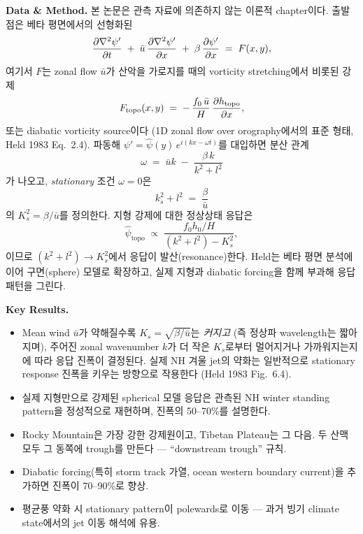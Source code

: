 \medskip
\noindent\textbf{Data \& Method.}\quad
본 논문은 관측 자료에 의존하지 않는 이론적 chapter이다.  출발점은 베타 평면에서의
선형화된 
\begin{equation}\label{eq:ch06_dd_held_qg}
  \frac{\partial \nabla^2\psi'}{\partial t} \;+\; \bar u\,\frac{\partial \nabla^2\psi'}{\partial x}
  \;+\; \beta\,\frac{\partial \psi'}{\partial x} \;=\; F(x,y),
\end{equation}
여기서 $F$는 zonal flow $\bar u$가 산악을 가로지를 때의 vorticity stretching에서 비롯된 강제
\begin{equation}\label{eq:ch06_dd_held_topoforcing}
  F_{\text{topo}}(x,y) \;=\; -\,\frac{f_0\,\bar u}{H}\,\frac{\partial h_{\text{topo}}}{\partial x} ,
\end{equation}
또는 diabatic vorticity source이다 (1D zonal flow over orography에서의 표준 형태,
Held 1983 Eq.~2.4).
파동해 $\psi' = \hat\psi(y)\,e^{i(kx-\omega t)}$를 대입하면 분산 관계
\begin{equation}\label{eq:ch06_dd_held_dispersion}
  \omega \;=\; \bar u k \;-\; \frac{\beta\,k}{k^2 + l^2}
\end{equation}
가 나오고, \emph{stationary} 조건 $\omega = 0$은
\begin{equation}\label{eq:ch06_dd_held_resonant_k}
  \boxed{\;k_s^2 + l^2 \;=\; \frac{\beta}{\bar u}\;}
\end{equation}
의  $K_s^2 = \beta/\bar u$를 정의한다.
지형 강제에 대한 정상상태 응답은
\begin{equation}\label{eq:ch06_dd_held_topo_response}
  \hat\psi_{\text{topo}}
  \;\propto\; \frac{f_0 h_0 / H}{(k^2 + l^2) - K_s^2},
\end{equation}
이므로 $(k^2+l^2) \to K_s^2$에서 응답이 발산(resonance)한다.  Held는 베타 평면 분석에 이어
구면(sphere) 모델로 확장하고, 실제 지형과 diabatic forcing을 함께 부과해 응답 패턴을 그린다.

\medskip
\noindent\textbf{Key Results.}
\begin{itemize}
  \item Mean wind $\bar u$가 약해질수록 $K_s = \sqrt{\beta/\bar u}$는 \emph{커지고}
        (즉 정상파 wavelength는 짧아지며), 주어진 zonal wavenumber $k$가 더 작은
        $K_s$로부터 멀어지거나 가까워지는지에 따라 응답 진폭이 결정된다.
        실제 NH 겨울 jet의 약화는 일반적으로 stationary response 진폭을 키우는
        방향으로 작용한다 (Held 1983 Fig.~6.4).
  \item 실제 지형만으로 강제된 spherical 모델 응답은 관측된 NH winter
        standing pattern을 정성적으로 재현하며, 진폭의 50--70\%를 설명한다.
  \item Rocky Mountain은 가장 강한 강제원이고, Tibetan Plateau는 그 다음.
        두 산맥 모두 그 동쪽에 trough를 만든다 --- ``downstream trough'' 규칙.
  \item Diabatic forcing(특히 storm track 가열, ocean western boundary current)을
        추가하면 진폭이 70--90\%로 향상.
  \item 평균풍 약화 시 stationary pattern이 polewards로 이동 ---
        과거 빙기 climate state에서의 jet 이동 해석에 유용.
\end{itemize}

